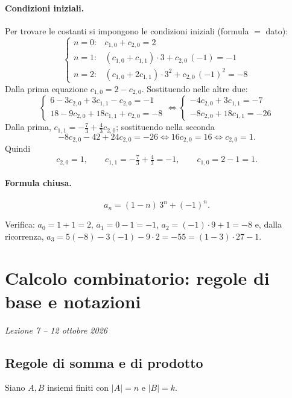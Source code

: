 \documentclass[11pt,a4paper]{article}
\begin{document}
\paragraph{Condizioni iniziali.} Per trovare le costanti si impongono le condizioni iniziali (formula $=$ dato):
\[
\begin{cases}
n = 0: & c_{1,0} + c_{2,0} = 2 \\
n = 1: & (c_{1,0} + c_{1,1})\cdot 3 + c_{2,0}\,(-1) = -1 \\
n = 2: & (c_{1,0} + 2c_{1,1})\cdot 3^2 + c_{2,0}\,(-1)^2 = -8
\end{cases}
\]
Dalla prima equazione $c_{1,0} = 2 - c_{2,0}$. Sostituendo nelle altre due:
\[
\begin{cases}
6 - 3c_{2,0} + 3c_{1,1} - c_{2,0} = -1 \\
18 - 9c_{2,0} + 18c_{1,1} + c_{2,0} = -8
\end{cases}
\iff
\begin{cases}
-4c_{2,0} + 3c_{1,1} = -7 \\
-8c_{2,0} + 18c_{1,1} = -26
\end{cases}
\]
Dalla prima, $c_{1,1} = -\tfrac{7}{3} + \tfrac{4}{3} c_{2,0}$; sostituendo nella seconda
\[
-8c_{2,0} - 42 + 24c_{2,0} = -26 \iff 16 c_{2,0} = 16 \iff c_{2,0} = 1 .
\]
Quindi
\[
c_{2,0} = 1, \qquad c_{1,1} = -\tfrac{7}{3} + \tfrac{4}{3} = -1, \qquad c_{1,0} = 2 - 1 = 1 .
\]

\paragraph{Formula chiusa.}
\[
a_n = (1 - n)\, 3^n + (-1)^n .
\]

Verifica: $a_0 = 1 + 1 = 2$, $a_1 = 0 - 1 = -1$, $a_2 = (-1)\cdot 9 + 1 = -8$ e, dalla ricorrenza, $a_3 = 5(-8) - 3(-1) - 9\cdot 2 = -55 = (1-3)\cdot 27 - 1$.

\section[Calcolo combinatorio: regole di base e notazioni (Lezione 7 -- 12 ottobre 2026)]{Calcolo combinatorio: regole di base e notazioni}
\noindent\emph{Lezione 7 -- 12 ottobre 2026}
\subsection{Regole di somma e di prodotto}

Siano $A, B$ insiemi finiti con $|A| = n$ e $|B| = k$.
\end{document}
